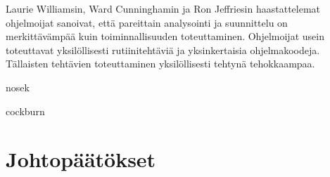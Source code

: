 \documentclass[finnish]{tktltiki2}
\theoremstyle{definition}
\theoremstyle{remark}
\begin{document}
Laurie Williamsin, Ward Cunninghamin ja Ron Jeffriesin haastattelemat ohjelmoijat sanoivat, että pareittain analysointi ja suunnittelu on merkittävämpää kuin toiminnallisuuden toteuttaminen. Ohjelmoijat usein toteuttavat yksilöllisesti rutiinitehtäviä ja yksinkertaisia ohjelmakoodeja. Tällaisten tehtävien toteuttaminen yksilöllisesti tehtynä tehokkaampaa\cite{WIL00}.

nosek\cite{NOS98}

cockburn\cite{COC00a}

\section{Johtopäätökset}


%
%
% 
%



\end{document}

